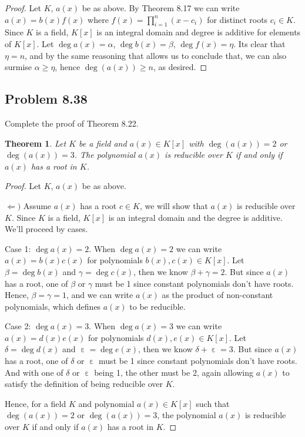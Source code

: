 \documentclass[letterpaper, 12pt]{amsart}
\DeclareMathOperator{\ep}{\varepsilon}
\newtheorem{thm}{Theorem}
\begin{document}
		\begin{proof}
		Let $K$, $a(x)$ be as above.
		By Theorem 8.17 we can write $a(x) = b(x)f(x)$ where $f(x) = \prod_{i=1}^{n} (x - c_{i})$ for distinct roots $c_{i} \in K$.
		Since $K$ is a field, $K[x]$ is an integral domain and degree is additive for elements of $K[x]$.
		Let $\deg{a(x)} = \alpha$, $\deg{b(x)} = \beta$, $\deg{f(x)} = \eta$.
		Its clear that $\eta = n$, and by the same reasoning that allows us to conclude that, we can also surmise $\alpha \geq \eta$, hence $\deg(a(x)) \geq n$, as desired.
		\end{proof}

	\subsection*{Problem 8.38}
	\label{sub:probem_8_38}
	Complete the proof of Theorem 8.22.
	\setcounter{thm}{21}
		\begin{thm}
		Let $K$ be a field and $a(x) \in K[x]$ with $\deg(a(x)) = 2$ or $\deg(a(x)) = 3$. 
		The polynomial $a(x)$ is reducible over $K$ if and only if $a(x)$ has a root in $K$.
		\end{thm}

		\begin{proof}
		Let $K$, $a(x)$ be as above.

		$\Leftarrow)$ Assume $a(x)$ has a root $c \in K$, we will show that $a(x)$ is reducible over $K$.
		Since $K$ is a field, $K[x]$ is an integral domain and the degree is additive.
		We'll proceed by cases.

		Case 1: $\deg{a(x)} = 2$.
		When $\deg{a(x)} = 2$ we can write $a(x) = b(x)c(x)$ for polynomials $b(x), c(x) \in K[x]$. 
		Let $\beta = \deg{b(x)}$ and $\gamma = \deg{c(x)}$, then we know $\beta + \gamma = 2$.
		But since $a(x)$ has a root, one of $\beta$ or $\gamma$ must be 1 since constant polynomials don't have roots.
		Hence, $\beta = \gamma = 1$, and we can write $a(x)$ as the product of non-constant polynomials, which defines $a(x)$ to be reducible.

		Case 2: $\deg{a(x)} = 3$.
		When $\deg{a(x)} = 3$ we can write $a(x) = d(x)e(x)$ for polynomials $d(x), e(x) \in K[x]$. 
		Let $\delta = \deg{d(x)}$ and $\ep = \deg{e(x)}$, then we know $\delta + \ep = 3$.
		But since $a(x)$ has a root, one of $\delta$ or $\ep$ must be 1 since constant polynomials don't have roots.
		And with one of $\delta$ or $\ep$ being 1, the other must be 2, again allowing $a(x)$ to satisfy the definition of being reducible over $K$.

		Hence, for a field $K$ and polynomial $a(x) \in K[x]$ such that $\deg(a(x)) = 2$ or $\deg(a(x)) = 3$, the polynomial $a(x)$ is reducible over $K$ if and only if $a(x)$ has a root in $K$.
		\end{proof}
\end{document}
